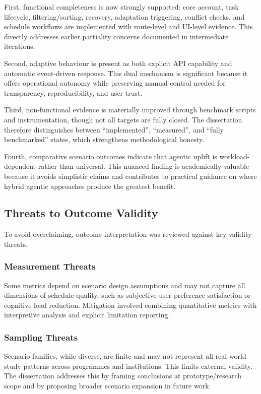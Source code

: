 \documentclass[12pt]{article}
\begin{document}
First, functional completeness is now strongly supported: core account, task lifecycle, filtering/sorting, recovery, adaptation triggering, conflict checks, and schedule workflows are implemented with route-level and UI-level evidence. This directly addresses earlier partiality concerns documented in intermediate iterations.

Second, adaptive behaviour is present as both explicit API capability and automatic event-driven response. This dual mechanism is significant because it offers operational autonomy while preserving manual control needed for transparency, reproducibility, and user trust.

Third, non-functional evidence is materially improved through benchmark scripts and instrumentation, though not all targets are fully closed. The dissertation therefore distinguishes between ``implemented'', ``measured'', and ``fully benchmarked'' states, which strengthens methodological honesty.

Fourth, comparative scenario outcomes indicate that agentic uplift is workload-dependent rather than universal. This nuanced finding is academically valuable because it avoids simplistic claims and contributes to practical guidance on where hybrid agentic approaches produce the greatest benefit.

\subsection{Threats to Outcome Validity}
To avoid overclaiming, outcome interpretation was reviewed against key validity threats.

\subsubsection{Measurement Threats}
Some metrics depend on scenario design assumptions and may not capture all dimensions of schedule quality, such as subjective user preference satisfaction or cognitive load reduction. Mitigation involved combining quantitative metrics with interpretive analysis and explicit limitation reporting.

\subsubsection{Sampling Threats}
Scenario families, while diverse, are finite and may not represent all real-world study patterns across programmes and institutions. This limits external validity. The dissertation addresses this by framing conclusions at prototype/research scope and by proposing broader scenario expansion in future work.
\end{document}
